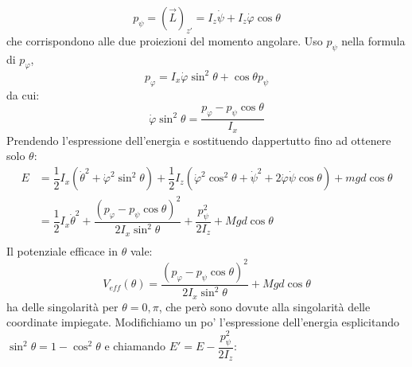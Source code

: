 \documentclass[a4paper,openany]{article}
\begin{document}
	$$
	p_{\psi} = (\vec{L})_{z'} =  I_z\dot{\psi} + I_z \dot{\varphi}\cos\theta
	$$
	che corrispondono alle due proiezioni del momento angolare. Uso $p_{\psi}$ nella formula di $p_{\varphi}$, 
	$$
	p_{\varphi} = I_x \dot{\varphi}\sin^2\theta + \cos\theta p_{\psi}
	$$
	da cui:
	$$
	\dot{\varphi}\sin^2\theta = \dfrac{p_{\varphi}- p_{\psi}\cos\theta}{I_x}
	$$
	Prendendo l'espressione dell'energia e sostituendo dappertutto fino ad ottenere solo $\theta$:
	\begin{equation}\label{key}
		\begin{aligned}
			E &= \dfrac{1}{2}I_x (\dot{\theta}^{2}+ \dot{\varphi}^2\sin^{2}\theta)+\dfrac{1}{2}I_z(\dot{\varphi}^{2}\cos^{2}\theta+\dot{\psi}^{2}+2\dot{\varphi}\dot{\psi}\cos\theta) + mgd\cos\theta \\
			&= \dfrac{1}{2}I_x\dot{\theta}^{2} + \dfrac{(p_{\varphi}- p_{\psi}\cos\theta)^2}{2I_x\sin^2\theta} + \dfrac{p_{\psi}^{2}}{2I_z} + Mgd\cos\theta \\
		\end{aligned}
	\end{equation}
	Il potenziale efficace in $\theta$ vale:
	$$
	V_{eff}(\theta) = \dfrac{(p_{\varphi}- p_{\psi}\cos\theta)^2}{2I_x\sin^2\theta} + Mgd\cos\theta 
	$$
	ha delle singolarità per $\theta = 0,\pi$, che però sono dovute alla singolarità delle coordinate impiegate. Modifichiamo un po' l'espressione dell'energia esplicitando $\sin^2\theta = 1-\cos^2\theta$ e chiamando $E' = E - \dfrac{p_{\psi}^2}{2I_z}$:
	
\end{document}
